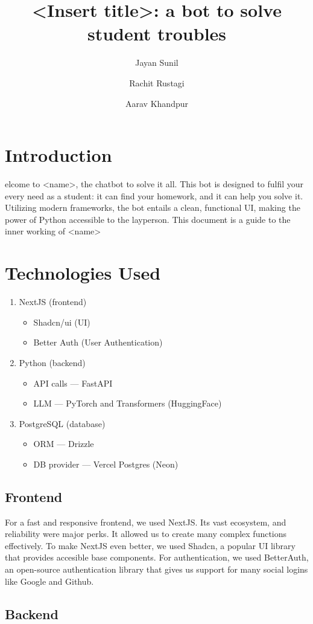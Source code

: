 \documentclass[9pt,a4paper,twocolumn,twoside]{tau-class/tau}
\title{<Insert title>: a bot to solve student troubles}
\author[a,1]{Jayan Sunil}
\author[b,2]{Rachit Rustagi}
\author[c,3]{Aarav Khandpur}
\affil[a]{IX --- Everest, +91 9910856655}
\affil[b]{IX --- Nilgiris, idk}
\affil[c]{IX --- Nilgiris, idk}
\begin{document}
\maketitle
\thispagestyle{firststyle}
\tauabstract
\tableofcontents
\linenumbers


\section{Introduction}

elcome to <name>, the chatbot to solve it all. This bot is designed to fulfil your every need as a student: it can find your homework, and it can help you solve it. Utilizing modern frameworks, the bot entails a clean, functional UI, making the power of Python accessible to the layperson. This document is a guide to the inner working of <name>


\section{Technologies Used}
\begin{enumerate}
	\item NextJS (frontend)
	      \begin{itemize}
		      \item Shadcn/ui (UI)
		      \item Better Auth (User Authentication)
	      \end{itemize}
	\item Python (backend)
	      \begin{itemize}
		      \item API calls --- FastAPI
		      \item LLM --- PyTorch and Transformers (HuggingFace)
	      \end{itemize}
	\item PostgreSQL (database)
	      \begin{itemize}
		      \item ORM --- Drizzle
		      \item DB provider --- Vercel Postgres (Neon)
	      \end{itemize}
\end{enumerate}
\subsection{Frontend}
For a fast and responsive frontend, we used NextJS. Its vast ecosystem, and reliability were major perks. It allowed us to create many complex functions effectively. To make NextJS even better, we used Shadcn, a popular UI library that provides accesible base components. For authentication, we used BetterAuth, an open-source authentication library that gives us support for many social logins like Google and Github.


\subsection{Backend}
\end{document}
